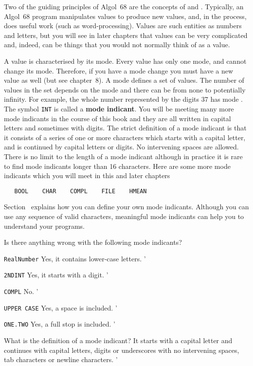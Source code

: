 Two of the guiding principles of Algol~68 are the concepts of
 and .  Typically, an Algol~68 program
manipulates values to produce new values, and, in the process, does
useful work (such as word-processing). Values are such entities as
numbers and letters, but you will see in later chapters that values
can be very complicated and, indeed, can be things that you would not
normally think of as a value.

A value is characterised by its mode.  Every value has only one mode,
and cannot change its mode.  Therefore, if you have a mode change you
must have a new value as well (but see chapter~8).  A mode defines a
set of values. The number of values in the set depends on the mode
and there can be from none to potentially infinity.  For example, the
whole number represented by the digits 37 has mode .  The
symbol \verb|INT| is called a \textbf{mode indicant}.  You will be
meeting many more mode indicants in the course of this book and they
are all written in capital letters and sometimes with digits.  The
strict definition of a mode indicant is that it consists of a series
of one or more characters which starts with a capital letter, and is
continued by capital letters or digits.  No intervening spaces are
allowed.  There is no limit to the length of a mode indicant although
in practice it is rare to find mode indicants longer than 16
characters.  Here are some more mode indicants which you will meet in
this and later chapters
\begin{verbatim}
   BOOL    CHAR    COMPL    FILE    HMEAN
\end{verbatim}
\noindent
Section~ explains how you can define your own mode
indicants. Although you can use any sequence of valid characters,
meaningful mode indicants can help you to understand your programs.
\begin{exercise}
\item Is there anything wrong with the following mode indicants?
\begin{subex}
\item \verb|RealNumber| \subans Yes, it contains lower-case letters.
'
\item \verb|2NDINT| \subans Yes, it starts with a digit.
'
\item \verb|COMPL| \subans No.
'
\item \verb|UPPER CASE| \subans Yes, a space is included.
'
\item \verb|ONE.TWO| \subans Yes, a full stop is included.
'
\end{subex}
\item What is the definition of a mode indicant?  \ans It starts with
a capital letter and continues with capital letters, digits or
underscores with no intervening spaces, tab characters or newline
characters.
'
\end{exercise}
